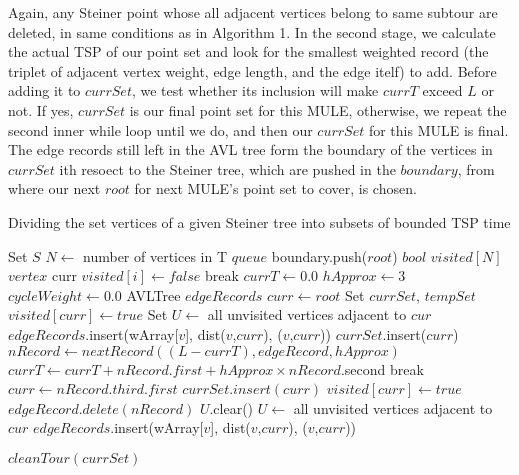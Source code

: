 Again, any Steiner point whose all adjacent vertices belong to same subtour are deleted, in same conditions as in Algorithm 1. In the second stage, we calculate the actual TSP of our point set and look for the smallest weighted record (the triplet of adjacent vertex weight, edge length, and the edge itelf) to add. Before adding it to $currSet$, we test whether its inclusion will make $currT$ exceed $L$ or not. If yes, $currSet$ is our final point set for this MULE, otherwise, we repeat the second inner while loop until we do, and then our $currSet$ for this MULE is final. The edge records still left in the AVL tree form the boundary of the vertices in $currSet$ ith resoect to the Steiner tree, which are pushed in the $boundary$, from where our next $root$ for next MULE's point set to cover, is chosen.

\begin{algorithm}
\caption{Dividing the set vertices of a given Steiner tree into subsets of bounded TSP time}\label{euclid2}
\begin{algorithmic}
\State Set  $S$
\State $N \gets$ number of vertices in T
\State $queue$ boundary.push($root$) 
\State $bool$ $visited[N]$
\State $vertex$ curr 
	\State $visited[i] \gets false$ 
\EndFor
{}
		\State break
	\EndIf
	\State $currT \gets 0.0$ 
	\State $hApprox \gets 3$ 
	\State $cycleWeight \gets 0.0$ 
	\State AVLTree $edgeRecords$  
	\State $curr \gets root$ 
	\State Set $currSet$, $tempSet$ 
	\State $visited[curr] \gets true$ 
	\State Set $U \gets$ all unvisited vertices adjacent to $cur$ 
		\State $edgeRecords$.insert(wArray[$v$], dist($v$,$curr$), ($v$,$curr$)) 
	\EndFor
	\State $currSet$.insert($curr$) 
		\State $nRecord \gets nextRecord((L-currT),edgeRecord,hApprox)$
		\State $currT \gets currT + nRecord.first + hApprox \times nRecord$.second 
			break 
		\EndIf
		\State $curr \gets nRecord.third.first$
		\State $currSet.insert(curr)$ 
		\State $visited[curr] \gets true$ 
		\State $edgeRecord.delete(nRecord)$
		\State $U$.clear() 
		\State $U \gets$ all unvisited vertices adjacent to $cur$ 
			\State $edgeRecords$.insert(wArray[$v$], dist($v$,$curr$), ($v$,$curr$)) 
		\EndFor
	\EndWhile
	
	\State $cleanTour(currSet)$
	
\end{algorithmic}
\end{algorithm}

